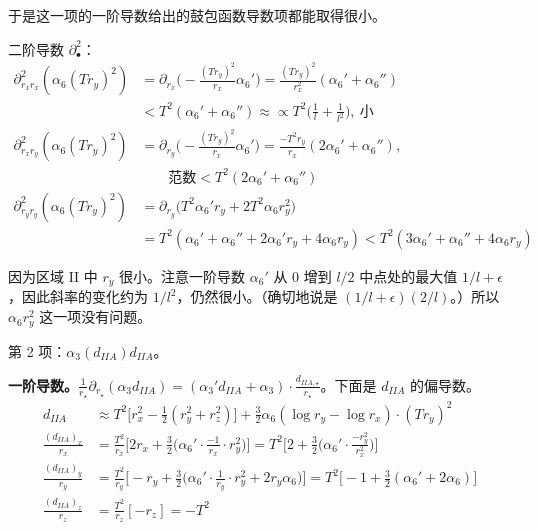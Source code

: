 于是这一项的一阶导数给出的鼓包函数导数项都能取得很小。

\medskip
\noindent 二阶导数 $\partial^2_\bullet$：
\begin{align*}
\partial^2_{r_xr_x}(\alpha_6(Tr_y)^2)&=\partial_{r_x}\Big(-\frac{(Tr_y)^2}{r_x}\alpha_6'\Big)
=\frac{(Tr_y)^2}{r_x^2}(\alpha_6'+\alpha_6'')\\
&<T^2(\alpha_6'+\alpha_6'')\approx\propto T^2\Big(\frac1l+\frac1{l^2}\Big),\ \text{小}\\
\partial^2_{r_xr_y}(\alpha_6(Tr_y)^2)&=\partial_{r_y}\Big(-\frac{(Tr_y)^2}{r_x}\alpha_6'\Big)
=\frac{-T^2r_y}{r_x}(2\alpha_6'+\alpha_6''),\\
&\qquad\text{范数}<T^2(2\alpha_6'+\alpha_6'')\\
\partial^2_{r_yr_y}(\alpha_6(Tr_y)^2)&=\partial_{r_y}\big(T^2\alpha_6'r_y+2T^2\alpha_6r_y^2\big)\\
&=T^2(\alpha_6'+\alpha_6''+2\alpha_6'r_y+4\alpha_6r_y)<T^2(3\alpha_6'+\alpha_6''+4\alpha_6r_y)
\end{align*}

因为区域 II 中 $r_y$ 很小。注意一阶导数 $\alpha_6'$ 从 $0$ 增到 $l/2$ 中点处的最大值 $1/l+\epsilon$，因此斜率的变化约为 $1/l^2$，仍然很小。（确切地说是 $(1/l+\epsilon)(2/l)$。）所以 $\alpha_6r_y^2$ 这一项没有问题。

第 2 项：$\alpha_3(d_{IIA})d_{IIA}$。

\medskip
\noindent\textbf{一阶导数。}$\frac{1}{r_\star}\partial_{r_\star}(\alpha_3d_{IIA})=(\alpha_3'd_{IIA}+\alpha_3)\cdot\frac{d_{IIA,\star}}{r_\star}$。下面是 $d_{IIA}$ 的偏导数。
\begin{align*}
d_{IIA}&\approx T^2\Big[r_x^2-\frac12(r_y^2+r_z^2)\Big]+\frac32\alpha_6(\log r_y-\log r_x)\cdot(Tr_y)^2\\
\frac{(d_{IIA})_x}{r_x}&=\frac{T^2}{r_x}\Big[2r_x+\frac32\Big(\alpha_6'\cdot\frac{-1}{r_x}\cdot r_y^2\Big)\Big]
=T^2\Big[2+\frac32\Big(\alpha_6'\cdot\frac{-r_y^2}{r_x^2}\Big)\Big]\\
\frac{(d_{IIA})_y}{r_y}&=\frac{T^2}{r_y}\Big[-r_y+\frac32\Big(\alpha_6'\cdot\frac1{r_y}\cdot r_y^2+2r_y\alpha_6\Big)\Big]
=T^2\Big[-1+\frac32(\alpha_6'+2\alpha_6)\Big]\\
\frac{(d_{IIA})_z}{r_z}&=\frac{T^2}{r_z}[-r_z]=-T^2
\end{align*}

